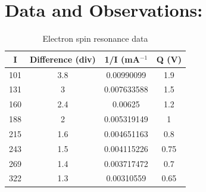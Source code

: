 \documentclass{multi}
\begin{document}
\section{Data and Observations:}
\begin{table}[h!]
\centering
\begin{tabular}{|c|c|c|c|}
\hline
\textbf{I} & \textbf{Difference (div)} & \textbf{1/I (mA$^{-1}$} & \textbf{Q (V)} \\ \hline
101 & 3.8 & 0.00990099 & 1.9 \\ \hline
131 & 3 & 0.007633588 & 1.5 \\ \hline
160 & 2.4 & 0.00625 & 1.2 \\ \hline
188 & 2 & 0.005319149 & 1 \\ \hline
215 & 1.6 & 0.004651163 & 0.8 \\ \hline
243 & 1.5 & 0.004115226 & 0.75 \\ \hline
269 & 1.4 & 0.003717472 & 0.7 \\ \hline
322 & 1.3 & 0.00310559 & 0.65 \\ \hline
\end{tabular}
\caption{Electron spin resonance data}
\label{tab:my-esr}
\end{table}
\end{document}

